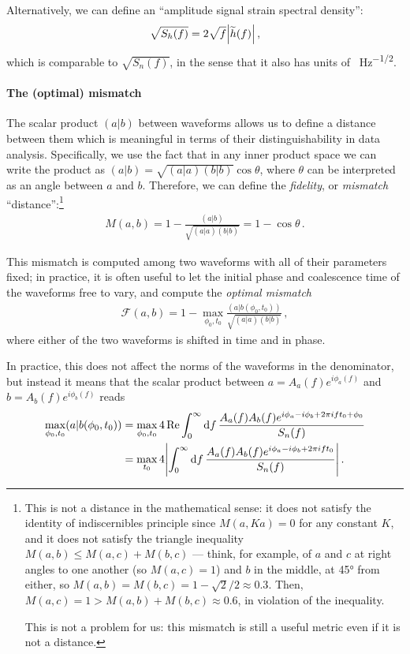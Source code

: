 \documentclass[main.tex]{subfiles}
\begin{document}
Alternatively, we can define an ``amplitude signal strain spectral density'': 
%
\begin{align}
\sqrt{S_h (f)} = 2 \sqrt{f} \abs{\widetilde{h}(f)}
\,,
\end{align}
%
which is comparable to \(\sqrt{S_n(f)}\), in the sense that it also has units of \SI{}{Hz^{-1/2}}.

\paragraph{The (optimal) mismatch}

The scalar product \((a|b)\) between waveforms allows us to define a distance between them which is meaningful in terms of their distinguishability in data analysis.
Specifically, we use the fact that in any inner product space we can write the product as \((a|b) = \sqrt{(a|a) (b|b)} \cos \theta \), where \(\theta \) can be interpreted as an angle between \(a\) and \(b\). 
Therefore, we can define the \emph{fidelity}, or \emph{mismatch} ``distance'':\footnote{This is not a distance in the mathematical sense: it does not satisfy the identity of indiscernibles principle since \(M(a, Ka) = 0\) for any constant \(K\), and it does not satisfy the triangle inequality \(M(a, b) \leq M(a, c) + M(b, c)\) --- think, for example, of \(a\) and \(c\) at right angles to one another (so \(M(a, c) = 1\)) and \(b\) in the middle, at 45° from either, so \(M(a, b) = M(b, c) = 1 - \sqrt{2} / 2 \approx 0.3\). Then, \(M(a,c) = 1 > M(a, b) + M(b, c) \approx 0.6\), in violation of the inequality. 

This is not a problem for us: this mismatch is still a useful metric even if it is not a distance. }
%
\begin{align}
M(a, b) = 1 - \frac{(a|b)}{\sqrt{(a|a) (b|b)}} = 1 - \cos \theta 
\,.
\end{align}

This mismatch is computed among two waveforms with all of their parameters fixed; in practice, it is often useful to let the initial phase and coalescence time of the waveforms free to vary, and compute the \emph{optimal mismatch}
%
\begin{align}
\mathcal{F}(a, b) = 1 - \max_{\phi_0 , t_0 } \frac{(a|b(\phi_0, t_0 ))}{\sqrt{(a|a)(b|b)}}
\,,
\end{align}
%
where either of the two waveforms is shifted in time and in phase.

In practice, this does not affect the norms of the waveforms in the denominator, but instead it means that the scalar product between \(a = A_a(f) e^{i \phi _a (f)}\) and \(b = A_b (f) e^{i \phi _b (f)}\) reads 
%
\begin{align}
\max_{\phi_0 , t_0 } (a|b(\phi_0 , t_0 )) 
&= \max_{\phi_0, t_0 } 4 \Re \int_{0}^{\infty } \dd{f} \frac{A_a (f) A_b(f) e^{i \phi_a - i \phi _b + 2 \pi i f t_0 + \phi_0 }}{S_n (f)} \\
&= \max_{t_0 } 4 \abs{\int_{0}^{\infty } \dd{f} \frac{A_a (f) A_b(f) e^{i \phi_a - i \phi _b + 2 \pi i f t_0 }}{S_n (f)}}
\,.
\end{align}
\end{document}
